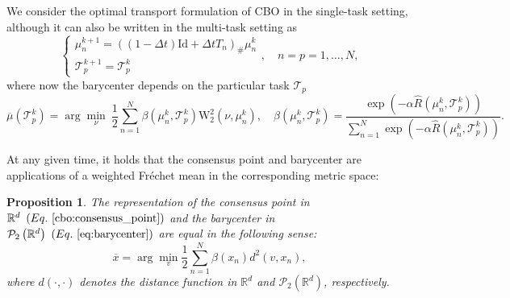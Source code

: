 \documentclass[a4paper, 11pt]{article}
\newcommand{\R}{\mathbb{R}}
\theoremstyle{plain} %
\newtheorem{proposition}{Proposition}
\begin{document}
	We consider the optimal transport formulation of CBO in the single-task setting, although it can also be written in the multi-task setting as
	\begin{equation}
		\begin{cases}
			\mu_{n}^{k+1} = \left( \left( 1 - \Delta t \right)\text{Id} + \Delta t T_{n} \right)_{\#}\mu_{n}^{k}\\
			\mathcal{T}_{p}^{k+1} = \mathcal{T}_{p}^{k}
		\end{cases},\quad n=p=1,\dots,N,
	\end{equation}
	where now the barycenter depends on the particular task $\mathcal{T}_{p}$
	\begin{equation}
		\overline{\mu}\left(\mathcal{T}_{p}^{k}\right) = \arg \min_{\nu}~\frac{1}{2}\sum_{n=1}^{N} \beta\left( \mu_{n}^{k}, \mathcal{T}_{p}^{k}\right)\mathrm{W}_{2}^{2}\left( \nu, \mu_{n}^{k} \right), \quad \beta\left(\mu_{n}^{k}, \mathcal{T}_{p}^{k}\right) = \frac{\exp(-\alpha \hat{R}\left(\mu_{n}^{k}, \mathcal{T}_{p}^{k}\right))}{\sum_{n=1}^{N}\exp(-\alpha \hat{R}\left(\mu_{n}^{k}, \mathcal{T}_{p}^{k}\right))}.
	\end{equation}

	At any given time, it holds that the consensus point and barycenter are applications of a weighted Fréchet mean in the corresponding metric space:
	\begin{proposition}\label{Proposition1}
		The representation of the consensus point in $\R^{d}~\left(Eq.~\eqref{cbo:consensus_point}\right)$ and the barycenter in $ \mathcal{P}_{2}\left( \R^{d} \right)~\left(Eq.~\eqref{eq:barycenter}\right)$ are equal in the following sense:
		\begin{equation}\label{eq:frechet_mean}
			\overline{x} = \arg \min_{v} \frac{1}{2}\sum_{n=1}^{N}\beta \left( x_n \right) d^{2}\left( v, x_{n} \right),
		\end{equation}
		where $ d \left( \cdot, \cdot \right)  $ denotes the distance function in $ \R^{d} $ and $ \mathcal{P}_{2}(\R^{d}) $, respectively.
	\end{proposition}
\end{document}
